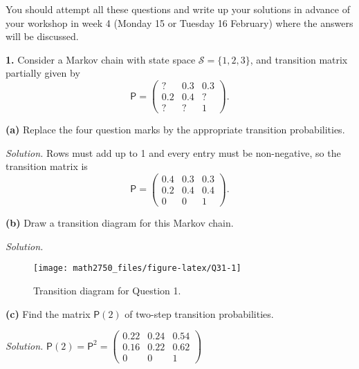 \documentclass[
  a4paper,
]{article}
\newif\ifcomm\commtrue
\theoremstyle{definition}
\theoremstyle{definition}
\theoremstyle{definition}
\theoremstyle{remark}
\begin{document}
\commtrue

You should attempt all these questions and write up your solutions in advance of your workshop in week 4 (Monday 15 or Tuesday 16 February) where the answers will be discussed.

\textbf{1.} Consider a Markov chain with state space \(\mathcal S = \{1,2,3\}\), and transition matrix partially given by
\[ \mathsf P = \begin{pmatrix} ? & 0.3 & 0.3 \\ 0.2 & 0.4 & ? \\ ? & ? & 1 \end{pmatrix} . \]

\textbf{(a)} Replace the four question marks by the appropriate transition probabilities.

\begin{myanswers}

\emph{Solution.} Rows must add up to 1 and every entry must be non-negative, so the transition matrix is
\[ \mathsf P = \begin{pmatrix} 0.4 & 0.3 & 0.3 \\ 0.2 & 0.4 & 0.4 \\ 0 & 0 & 1 \end{pmatrix} . \]

\end{myanswers}

\textbf{(b)} Draw a transition diagram for this Markov chain.

\begin{myanswers}

\emph{Solution.}

\begin{figure}

{\centering \texttt{[image: math2750\_files/figure-latex/Q31-1]} 

}

\caption{Transition diagram for Question 1.}\label{fig:Q31}
\end{figure}

\end{myanswers}

\textbf{(c)} Find the matrix \(\mathsf P(2)\) of two-step transition probabilities.

\begin{myanswers}

\emph{Solution.} \({\displaystyle \mathsf P(2) = \mathsf P^2 = \begin{pmatrix} 0.22 & 0.24 & 0.54 \\ 0.16 & 0.22 & 0.62 \\ 0 & 0 & 1 \end{pmatrix}}\)

\end{myanswers}
\end{document}
